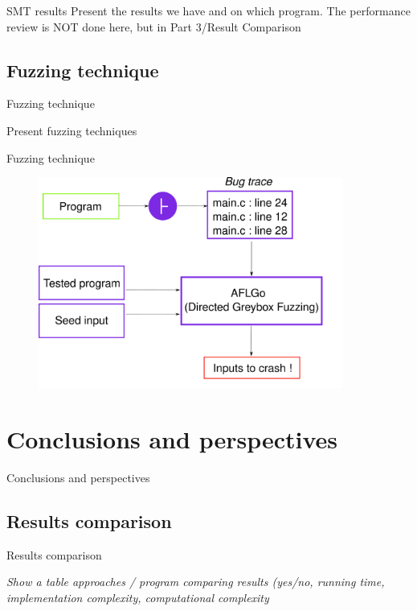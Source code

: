 \documentclass{beamer}
\begin{document}
\begin{frame}{SMT results}
Present the results we have and on which program. The performance review is NOT done here, but in Part 3/Result Comparison
\end{frame}

\subsection{Fuzzing technique}

\begin{frame}{Fuzzing technique}

Present fuzzing techniques

\end{frame}

\begin{frame}{Fuzzing technique}

\begin{figure}
\includegraphics[width=10cm]{Figures/Fuzzing.png}
\end{figure}

\end{frame}


\section{Conclusions and perspectives}

\begin{frame}
\centering
\LARGE Conclusions and perspectives
\end{frame}

\subsection{Results comparison}

\begin{frame}{Results comparison}

\textit{Show a table approaches / program comparing results (yes/no, running time, implementation complexity, computational complexity } \\

\end{frame}
\end{document}
